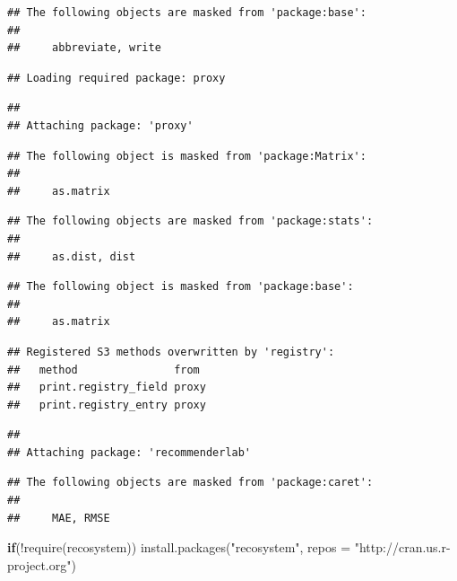 \documentclass[
]{article}
\newenvironment{Shaded}{}{}
\newcommand{\AttributeTok}[1]{\textcolor[rgb]{0.49,0.56,0.16}{#1}}
\newcommand{\ControlFlowTok}[1]{\textcolor[rgb]{0.00,0.44,0.13}{\textbf{#1}}}
\newcommand{\FunctionTok}[1]{\textcolor[rgb]{0.02,0.16,0.49}{#1}}
\newcommand{\NormalTok}[1]{#1}
\newcommand{\SpecialCharTok}[1]{\textcolor[rgb]{0.25,0.44,0.63}{#1}}
\newcommand{\StringTok}[1]{\textcolor[rgb]{0.25,0.44,0.63}{#1}}
\begin{document}
\begin{verbatim}
## The following objects are masked from 'package:base':
## 
##     abbreviate, write
\end{verbatim}

\begin{verbatim}
## Loading required package: proxy
\end{verbatim}

\begin{verbatim}
## 
## Attaching package: 'proxy'
\end{verbatim}

\begin{verbatim}
## The following object is masked from 'package:Matrix':
## 
##     as.matrix
\end{verbatim}

\begin{verbatim}
## The following objects are masked from 'package:stats':
## 
##     as.dist, dist
\end{verbatim}

\begin{verbatim}
## The following object is masked from 'package:base':
## 
##     as.matrix
\end{verbatim}

\begin{verbatim}
## Registered S3 methods overwritten by 'registry':
##   method               from 
##   print.registry_field proxy
##   print.registry_entry proxy
\end{verbatim}

\begin{verbatim}
## 
## Attaching package: 'recommenderlab'
\end{verbatim}

\begin{verbatim}
## The following objects are masked from 'package:caret':
## 
##     MAE, RMSE
\end{verbatim}

\begin{Shaded}
\begin{Highlighting}[]
\ControlFlowTok{if}\NormalTok{(}\SpecialCharTok{!}\FunctionTok{require}\NormalTok{(recosystem)) }\FunctionTok{install.packages}\NormalTok{(}\StringTok{"recosystem"}\NormalTok{, }
                                          \AttributeTok{repos =} \StringTok{"http://cran.us.r{-}project.org"}\NormalTok{)}
\end{Highlighting}
\end{Shaded}
\end{document}
